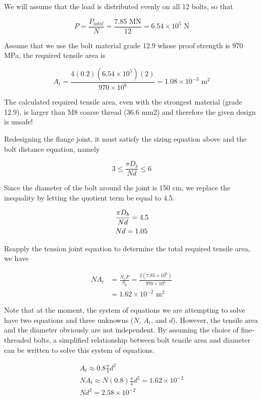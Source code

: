\documentclass[a4paper,openany,12pt]{book}
\begin{document}
{{We will assume that the load is distributed evenly on all 12 bolts, so
that

$$P = \frac{P_{total}}{N} = \frac{7.85 \text{ MN}}{12} = 6.54 \times
  {10^5}\text{ N}$$

Assume that we use the bolt material grade 12.9 whose proof strength is
970 MPa, the required tensile area is

$$A_t = \frac{4(0.2)(6.54 \times 10^5)(2)}{970 \times 10^6} = 1.08 \times 10^{-3} \text{ m}^2$$

The calculated required tensile area, even with the strongest material
(grade 12.9), is larger than M8 coarse thread (36.6 mm2) and therefore
the given design is unsafe!

Redesigning the flange joint, it must satisfy the sizing equation above
and the bolt distance equation, namely

$$3 \leqslant \frac{\pi D_b}{Nd} \leqslant 6$$

Since the diameter of the bolt around the joint is 150 cm, we replace
the inequality by letting the quotient term be equal to 4.5.

$$\begin{gathered}
  \frac{\pi D_b}{Nd} = 4.5 \hfill \\
  Nd = 1.05 \hfill \\ 
\end{gathered}$$

Reapply the tension joint equation to determine the total required
tensile area, we have

$$\begin{aligned}
  NA_t &= \frac{N_sP}{S_p} = \frac{2(7.85 \times 10^6)}{970 \times 10^6} \\
         &= 1.62 \times 10^{-2} \text{ m}^2\end{aligned}$$

Note that at the moment, the system of equations we are attempting to
solve have two equations and three unknowns (\(N\), \(A_t\), and \(d\)).
However, the tensile area and the diameter obviously are not
independent. By assuming the choice of fine-threaded bolts, a simplified
relationship between bolt tensile area and diameter can be written to
solve this system of equations.

$$\begin{gathered}
  A_t \approx 0.8\frac{\pi }{4}d^2 \\ 
  NA_t \approx N(0.8)\frac{\pi}{4}d^2 = 1.62 \times 10^{-2} \\ 
  Nd^2 = 2.58 \times 10^{-2} \\ 
\end{gathered}$$

}}
\end{document}
